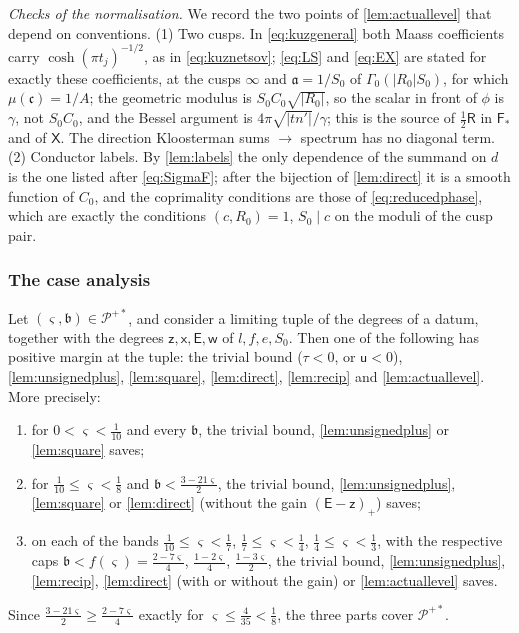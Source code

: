 \documentclass[11pt,colorlinks]{charlie}
\begin{document}
\emph{Checks of the normalisation.} We record the two points of \cref{lem:actuallevel} that depend on conventions. (1) Two cusps. In \eqref{eq:kuzgeneral} both Maass coefficients carry $\cosh(\pi t_j)^{-1/2}$, as in \eqref{eq:kuznetsov}; \eqref{eq:LS} and \eqref{eq:EX} are stated for exactly these coefficients, at the cusps $\infty$ and $\mathfrak a=1/S_0$ of $\Gamma_0(|R_0|S_0)$, for which $\mu(\mathfrak c)=1/A$; the geometric modulus is $S_0C_0\sqrt{|R_0|}$, so the scalar in front of $\phi$ is $\gamma$, not $S_0C_0$, and the Bessel argument is $4\pi\sqrt{|tn'|}/\gamma$; this is the source of $\frac12\mathsf R$ in $\mathsf F_*$ and of $\mathsf X$. The direction Kloosterman sums $\to$ spectrum has no diagonal term. (2) Conductor labels. By \cref{lem:labels} the only dependence of the summand on $d$ is the one listed after \eqref{eq:SigmaF}; after the bijection of \cref{lem:direct} it is a smooth function of $C_0$, and the coprimality conditions are those of \eqref{eq:reducedphase}, which are exactly the conditions $(c,R_0)=1$, $S_0\mid c$ on the moduli of the cusp pair.

\subsubsection*{The case analysis}

\begin{lemma}[Covering]\label{lem:cases}
Let $(\varsigma,\mathfrak b)\in\mathcal P^{+*}$, and consider a limiting tuple of the degrees of a datum, together with the degrees $\mathsf z,\mathsf x,\mathsf E,\mathsf w$ of $l,f,e,S_0$. Then one of the following has positive margin at the tuple: the trivial bound ($\tau<0$, or $\mathsf u<0$), \cref{lem:unsignedplus}, \cref{lem:square}, \cref{lem:direct}, \cref{lem:recip} and \cref{lem:actuallevel}. More precisely:
\begin{enumerate}[label=\textup{(\roman*)}]
\item for $0<\varsigma<\frac1{10}$ and every $\mathfrak b$, the trivial bound, \cref{lem:unsignedplus} or \cref{lem:square} saves;
\item for $\frac1{10}\le\varsigma<\frac18$ and $\mathfrak b<\frac{3-21\varsigma}2$, the trivial bound, \cref{lem:unsignedplus}, \cref{lem:square} or \cref{lem:direct} (without the gain $(\mathsf E-\mathsf z)_+$) saves;
\item on each of the bands $\frac1{10}\le\varsigma<\frac17$, $\frac17\le\varsigma<\frac14$, $\frac14\le\varsigma<\frac13$, with the respective caps $\mathfrak b<f(\varsigma)=\frac{2-7\varsigma}4$, $\frac{1-2\varsigma}4$, $\frac{1-3\varsigma}2$, the trivial bound, \cref{lem:unsignedplus}, \cref{lem:recip}, \cref{lem:direct} (with or without the gain) or \cref{lem:actuallevel} saves.
\end{enumerate}
\end{lemma}
Since $\frac{3-21\varsigma}2\ge\frac{2-7\varsigma}4$ exactly for $\varsigma\le\frac4{35}<\frac18$, the three parts cover $\mathcal P^{+*}$.
\end{document}
